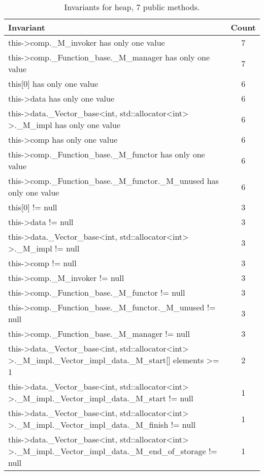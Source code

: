 \begin{table}[ht]
\centering
\scriptsize
\caption{Invariants for heap, 7 public methods.}
\label{heap_daikon}
\begin{tabular}{|l|c|}
\hline
Invariant & Count \\
\hline
this->comp.\_M\_invoker has only one value & 7 \\
this->comp.\_Function\_base.\_M\_manager has only one value & 7 \\
this[0] has only one value & 6 \\
this->data has only one value & 6 \\
this->data.\_Vector\_base<int, std::allocator<int> >.\_M\_impl has only one value & 6 \\
this->comp has only one value & 6 \\
this->comp.\_Function\_base.\_M\_functor has only one value & 6 \\
this->comp.\_Function\_base.\_M\_functor.\_M\_unused has only one value & 6 \\
this[0] != null & 3 \\
this->data != null & 3 \\
this->data.\_Vector\_base<int, std::allocator<int> >.\_M\_impl != null & 3 \\
this->comp != null & 3 \\
this->comp.\_M\_invoker != null & 3 \\
this->comp.\_Function\_base.\_M\_functor != null & 3 \\
this->comp.\_Function\_base.\_M\_functor.\_M\_unused != null & 3 \\
this->comp.\_Function\_base.\_M\_manager != null & 3 \\
this->data.\_Vector\_base<int, std::allocator<int> >.\_M\_impl.\_Vector\_impl\_data.\_M\_start[] elements >= 1 & 2 \\
this->data.\_Vector\_base<int, std::allocator<int> >.\_M\_impl.\_Vector\_impl\_data.\_M\_start != null & 1 \\
this->data.\_Vector\_base<int, std::allocator<int> >.\_M\_impl.\_Vector\_impl\_data.\_M\_finish != null & 1 \\
this->data.\_Vector\_base<int, std::allocator<int> >.\_M\_impl.\_Vector\_impl\_data.\_M\_end\_of\_storage != null & 1 \\
\hline
\end{tabular}
\end{table}


